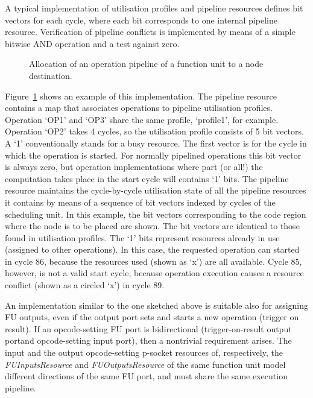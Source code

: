 \documentclass[a4paper,twoside]{tce}
\begin{document}
A typical implementation of utilisation profiles and pipeline resources
defines bit vectors for each cycle, where each bit corresponds to one
internal pipeline resource. Verification of pipeline conflicts is
implemented by means of a simple bitwise AND operation and a test against
zero.
%
\begin{figure}[tb]
\centerline{}
\caption{Allocation of an operation pipeline of a function unit to a node
  destination.}
  \label{fig:fu-resource-imp}
\end{figure}
%
Figure~\ref{fig:fu-resource-imp} shows an example of this implementation.
The pipeline resource contains a map that associates operations to pipeline
utilisation profiles. Operation `OP1' and `OP3' share the same profile,
`profile1', for example. Operation `OP2' takes 4 cycles, so the utilisation
profile consists of 5 bit vectors. A `1' conventionally stands for a busy
resource. The first vector is for the cycle in which the operation is
started. For normally pipelined operations this bit vector is always zero,
but operation implementations where part (or all!) the computation takes
place in the start cycle will contains `1' bits. The pipeline resource
maintains the cycle-by-cycle utilisation state of all the pipeline resources
it contains by means of a sequence of bit vectors indexed by cycles of the
scheduling unit. In this example, the bit vectors corresponding to the code
region where the node is to be placed are shown. The bit vectors are
identical to those found in utilisation profiles. The `1' bits represent
resources already in use (assigned to other operations). In this case, the
requested operation can started in cycle 86, because the resources used
(shown as `x') are all available. Cycle 85, however, is not a valid start
cycle, because operation execution causes a resource conflict (shown as a
circled `x') in cycle 89.

An implementation similar to the one sketched above is suitable also for
assigning FU outputs, even if the output port sets and starts a new
operation (trigger on result).
%
If an opcode-setting FU port is bidirectional (trigger-on-result output
portand opcode-setting input port), then a nontrivial requirement arises.
The input and the output opcode-setting p-socket resources of, respectively,
the \emph{FUInputsResource} and \emph{FUOutputsResource} of the same
function unit model different directions of the same FU port, and must share
the same execution pipeline.
\end{document}
